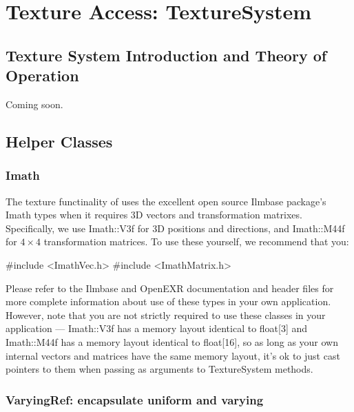 \chapter{Texture Access: {\cf TextureSystem}}
\label{chap:texturesystem}

\def\TextureSystem{{\kw TextureSystem}\xspace}
\def\TextureOptions{{\kw TextureOptions}\xspace}


\section{Texture System Introduction and Theory of Operation}
\label{sec:texturesys:intro}

Coming soon.

\section{Helper Classes}
\label{sec:texturesys:helperclasses}

\subsection{Imath}

The texture functinality of \product uses the excellent open source
{\cf Ilmbase} package's {\cf Imath} types when it requires 3D vectors
and transformation matrixes.  Specifically, we use {\cf Imath::V3f}
for 3D positions and directions, and {\cf Imath::M44f} for $4 \times 4$
transformation matrices.  To use these yourself, we recommend that you:

\begin{code}
    #include <ImathVec.h>
    #include <ImathMatrix.h>
\end{code}

Please refer to the {\cf Ilmbase} and {\cf OpenEXR}
documentation and header files for more complete information about
use of these types in your own application.  However, note that you
are not strictly required to use these classes in your application ---
{\cf Imath::V3f} has a memory layout identical to {\cf float[3]}
and {\cf Imath::M44f} has a memory layout identical to {\cf float[16]},
so as long as your own internal vectors and matrices have the same
memory layout, it's ok to just cast pointers to them when passing
as arguments to \TextureSystem methods.

\subsection{{\cf VaryingRef}: encapsulate uniform and varying}

